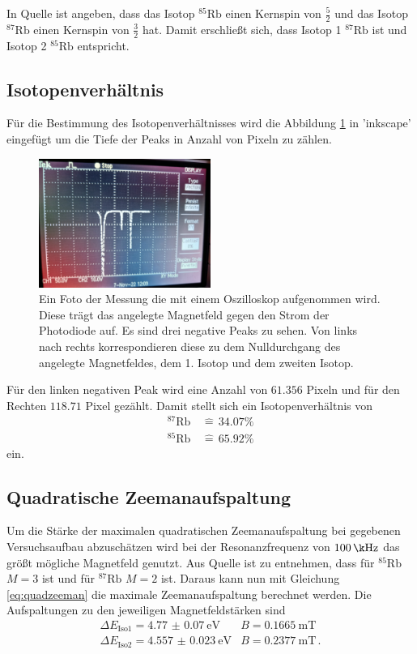 In Quelle \cite{pdf_anleitung} ist angeben, dass das Isotop {$^{85}\text{Rb}$ einen Kernspin von $\frac{5}{2}$} und das Isotop $^{87}\text{Rb}$ einen Kernspin von $\frac{3}{2}$ hat.
Damit erschließt sich, dass Isotop 1  $^{87}\text{Rb}$ ist und Isotop 2 $^{85}\text{Rb}$ entspricht.

\subsection{Isotopenverhältnis}
Für die Bestimmung des Isotopenverhältnisses wird die Abbildung \ref{fig:isotop} in 'inkscape' \cite{Inkscape} eingefügt um die Tiefe der Peaks in Anzahl von Pixeln zu zählen.

\begin{figure}[H]
    \centering
    \includegraphics[width=0.5\textwidth]{Data/isotope.jpeg}
    \caption{Ein Foto der Messung die mit einem Oszilloskop aufgenommen wird.
    Diese trägt das angelegte Magnetfeld gegen den Strom der Photodiode auf.
    Es sind drei negative Peaks zu sehen.
    Von links nach rechts korrespondieren diese zu dem Nulldurchgang des angelegte Magnetfeldes, dem 1. Isotop und dem zweiten Isotop.}
    \label{fig:isotop}
\end{figure}
Für den linken negativen Peak wird eine Anzahl von $61.356$ Pixeln und für den Rechten $118.71$ Pixel gezählt.
Damit stellt sich ein Isotopenverhältnis von 
\begin{align*}
    ^{87}\text{Rb} \, &\widehat{=}\, 34.07\% \\
    ^{85}\text{Rb} \, &\widehat{=}\, 65.92\%
\end{align*}
ein.

\subsection{Quadratische Zeemanaufspaltung}
Um die Stärke der maximalen quadratischen Zeemanaufspaltung bei gegebenen Versuchsaufbau abzuschätzen wird bei der Resonanzfrequenz von $\SI{100}{\k\Hz}$ das größt mögliche Magnetfeld genutzt.
Aus Quelle \cite{pdf_anleitung} ist zu entnehmen, dass für $^{85}\text{Rb}$ $M = 3$ ist und für $^{87}\text{Rb}$ $M = 2$ ist.
Daraus kann nun mit Gleichung \eqref{eq:quadzeeman} die maximale Zeemanaufspaltung berechnet werden.
Die Aufspaltungen zu den jeweiligen Magnetfeldstärken sind
\begin{align*}
    \Delta E_\text{Iso1} = \SI{4.77(7)}{\eV} & B=\SI{0.1665}{\m\tesla} \\
    \Delta E_\text{Iso2} = \SI{4.557(23)}{\eV} & B=\SI{0.2377}{\m\tesla}  \, .
\end{align*}

